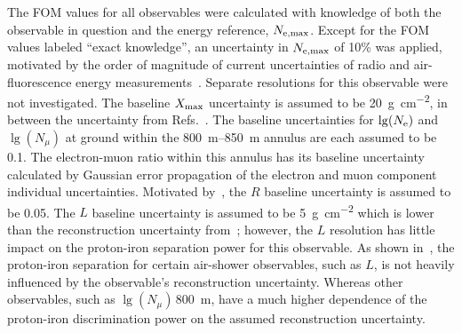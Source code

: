 The FOM values for all observables were calculated with knowledge of both the observable in question and the energy reference, $N_{\rm{e, max}}$.
Except for the FOM values labeled ``exact knowledge'', an uncertainty in $N_{\rm{e, max}}$ of 10\% was applied, motivated by the order of magnitude of current uncertainties of radio and air-fluorescence energy measurements~\cite{auger_prd2016_aeraenergyscale, auger_prl2016_aeraenergyscale, tunkarex_jcap2015_radiomeasurements, lopes_epjc2021_finalresults, auger_astropartphys2017_fdcalibration}.
Separate resolutions for this observable were not investigated.
The baseline $X_{\rm max}$ uncertainty is assumed to be \qty{20}{\gram\per\centi\meter\squared}, in between the uncertainty from Refs.~\cite{lofar_prd2014_xmax, tunkarex_prd2018_xmax}.
The baseline uncertainties for $\lg(N_{\rm{e}})$ and $\lg\left(N_{\mu}\right)$ at ground within the \qtyrange{800}{850}{\meter} annulus are each assumed to be 0.1.
The electron-muon ratio within this annulus has its baseline uncertainty calculated by Gaussian error propagation of the electron and muon component individual uncertainties.
Motivated by~\cite{auger_jcap2019_longitudinalprofiles}, the $R$ baseline uncertainty is assumed to be 0.05.
The $L$ baseline uncertainty is assumed to be \qty{5}{\gram\per\centi\meter\squared} which is lower than the reconstruction uncertainty from~\cite{auger_jcap2019_longitudinalprofiles}; however, the $L$ resolution has little impact on the proton-iron separation power for this observable.
As shown in~, the proton-iron separation for certain air-shower observables, such as $L$, is not heavily influenced by the observable's reconstruction uncertainty.
Whereas other observables, such as $\lg\left(N_{\mu}\right)$\,\qty{800}{\meter}, have a much higher dependence of the proton-iron discrimination power on the assumed reconstruction uncertainty.





